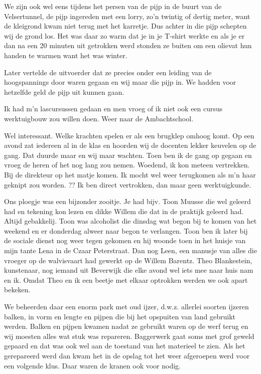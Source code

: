 \documentclass[10pt,twoside,openright]{memoir}
\begin{document}
We zijn ook wel eens tijdens het persen van de pijp in de buurt van de Velsertunnel, de pijp ingereden met een lorry, zo'n twintig of dertig meter, want de kleigrond kwam niet terug met het karretje. Dus achter in die pijp schepten wij de grond los. Het was daar zo warm dat je in je T-shirt werkte en als je er dan na een 20 minuten uit getrokken werd stonden ze buiten om een olievat hun handen te warmen want het was winter. 

Later vertelde de uitvoerder dat ze precies onder een leiding van de hoogspannings door waren gegaan en wij maar die pijp in. We hadden voor hetzelfde geld de pijp uit kunnen gaan.

Ik had m’n lascursussen gedaan en men vroeg of ik niet ook een cursus werktuigbouw zou willen doen. Weer naar de Ambachtschool. 

Wel interessant. Welke krachten spelen er als een brugklep omhoog komt. Op een avond zat iedereen al in de klas en hoorden wij de docenten lekker keuvelen op de gang. Dat duurde maar en wij maar wachten. Toen ben ik de gang op gegaan en vroeg de heren of het nog lang zou nemen. Woedend, ik kon meteen vertrekken. Bij de direkteur op het matje komen. Ik mocht wel weer terugkomen als m’n haar geknipt zou worden. ?? Ik ben direct vertrokken, dan maar geen werktuigkunde.

Ons ploegje was een bijzonder zooitje. Je had bijv. Toon Muusse die wel geleerd had en tekening kon lezen en dikke Willem die dat in de praktijk geleerd had. Altijd gebakkelij. Toon was alcoholist die dinsdag wat begon bij te komen van het weekend en er donderdag alweer naar begon te verlangen. Toon ben ik later bij de sociale dienst nog weer tegen gekomen en hij woonde toen in het huisje van mijn tante Lena in de Czaar Peterstraat. Dan nog Leen, een manusje van alles die vroeger op de walvisvaart had gewerkt op de Willem Barentz. Theo Blankestein, kunstenaar, nog iemand uit Beverwijk die elke avond wel iets mee naar huis nam en ik. Omdat Theo en ik een beetje met elkaar optrokken werden we ook apart bekeken. 

We beheerden daar een enorm park met oud ijzer, d.w.z. allerlei soorten ijzeren balken, in vorm en lengte en pijpen die bij het opspuiten van land gebruikt werden. Balken en pijpen kwamen nadat ze gebruikt waren op de werf terug en wij moesten alles wat stuk was repareren. Baggerwerk gaat soms met grof geweld gepaard en dat was ook wel aan de toestand van het materieel te zien. Als het gerepareerd werd dan kwam het in de opslag tot het weer afgeroepen werd voor een volgende klus. Daar waren de kranen ook voor nodig. 
\end{document}
